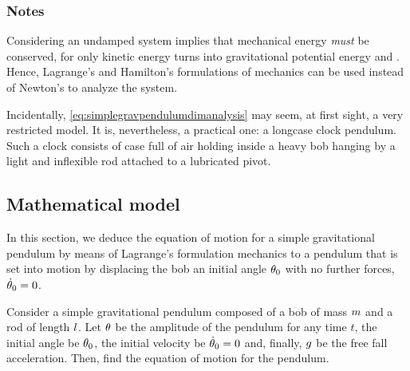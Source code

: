 \subsubsection{Notes}
Considering an undamped system implies that mechanical energy \emph{must} be conserved, for only kinetic energy turns into gravitational potential energy and \vis. Hence, Lagrange's and Hamilton's formulations of mechanics can be used instead of Newton's to analyze the system.

Incidentally, \cref{eq:simplegravpendulumdimanalysis} may seem, at first sight, a very restricted model. It is, nevertheless, a practical one: a longcase clock pendulum. Such a clock consists of case full of air holding inside a heavy bob hanging by a light and inflexible rod attached to a lubricated pivot.


\subsection{Mathematical model}\label{subsec:mathmodel}
In this section, we deduce the equation of motion for a simple gravitational pendulum by means of Lagrange's formulation mechanics to a pendulum that is set into motion by displacing the bob an initial angle $\theta_0$ with no further forces, $\dot{\theta}_0 = 0$.

Consider a simple gravitational pendulum composed of a bob of mass $m$ and a rod of length $l$. Let $\theta$ be the amplitude of the pendulum for any time $t$, the initial angle be $\theta_0$, the initial velocity be $\dot{\theta}_0 = 0$ and, finally, $g$ be the free fall acceleration. Then, find the equation of motion for the pendulum.

